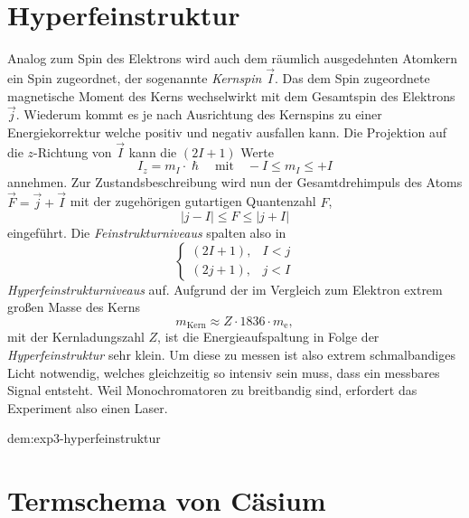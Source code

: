 \documentclass[../bericht.tex]{subfiles}
\begin{document}
      \cite{dem:exp3-feinstruktur}


    \section{Hyperfeinstruktur}
    \label{sec:hyperfeinstruktur}

      Analog zum Spin des Elektrons wird auch dem r\"aumlich ausgedehnten Atomkern ein Spin zugeordnet, der sogenannte \textit{Kernspin} $\vec{I}$. Das dem Spin zugeordnete magnetische Moment des Kerns wechselwirkt mit dem Gesamtspin des Elektrons $\vec{j}$. Wiederum kommt es je nach Ausrichtung des Kernspins zu einer Energiekorrektur welche positiv und negativ ausfallen kann. Die Projektion auf die $z$-Richtung von $\vec{I}$ kann die $(2I + 1)$ Werte
      \begin{equation*}
        I_z=m_I \cdot \hslash\quad\text{mit}\quad -I\le m_I \le +I
      \end{equation*}
      annehmen. Zur Zustandsbeschreibung wird nun der Gesamtdrehimpuls des Atoms $\vec{F}=\vec{j}+\vec{I}$ mit der zugeh\"origen gutartigen Quantenzahl $F$,
      \begin{equation*}
        |j-I| \le F\le |j + I|
      \end{equation*}
      eingef\"uhrt. Die \textit{Feinstrukturniveaus} spalten also in
      \begin{equation*}
        \begin{cases}
            (2I+1), & I<j\\
            (2j+1), & j<I
        \end{cases}
      \end{equation*}
      \textit{Hyperfeinstrukturniveaus} auf. Aufgrund der im Vergleich zum Elektron extrem gro\ss{}en Masse des Kerns
      \begin{equation*}
        m_\mathrm{Kern}\approx Z\cdot 1836 \cdot m_\mathrm{e},
      \end{equation*}
      mit der Kernladungszahl $Z$, ist die Energieaufspaltung in Folge der \textit{Hyperfeinstruktur} sehr klein. Um diese zu messen ist also extrem schmalbandiges Licht notwendig, welches gleichzeitig so intensiv sein muss, dass ein messbares Signal entsteht. Weil Monochromatoren zu breitbandig sind, erfordert das Experiment also einen Laser.

      dem:exp3-hyperfeinstruktur


    \section{Termschema von C\"asium}
    \label{sec:termschema-caesium}
\end{document}
